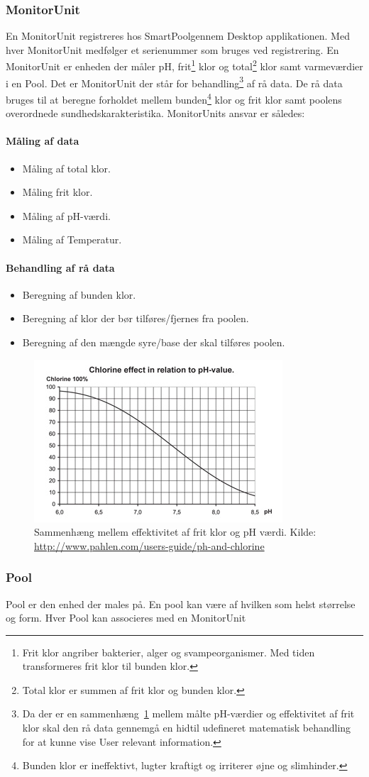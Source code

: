 \subsubsection{MonitorUnit}
En MonitorUnit registreres hos SmartPool\texttrademark gennem Desktop applikationen. Med hver MonitorUnit medfølger et serienummer som bruges ved registrering. En MonitorUnit er enheden der måler pH, frit\footnote{Frit klor angriber bakterier, alger og svampeorganismer. Med tiden transformeres frit klor til bunden klor.} klor og total\footnote{Total klor er summen af frit klor og bunden klor.} klor samt varmeværdier i en Pool. Det er MonitorUnit der står for behandling\footnote{Da der er en sammenhæng~\ref{fig:chlorinePh} mellem målte pH-værdier og effektivitet af frit klor skal den rå data gennemgå en hidtil udefineret matematisk behandling for at kunne vise User relevant information.} af rå data. De rå data bruges til at beregne forholdet mellem bunden\footnote{Bunden klor er ineffektivt, lugter kraftigt og irriterer øjne og slimhinder.} klor og frit klor samt poolens overordnede sundhedskarakteristika. MonitorUnits ansvar er således:

\paragraph{Måling af data}
\begin{itemize}
	\item Måling af total klor.
	\item Måling frit klor.
	\item Måling af pH-værdi.
	\item Måling af Temperatur.
\end{itemize}

\paragraph{Behandling af rå data}
\begin{itemize}
	\item Beregning af bunden klor.
	\item Beregning af klor der bør tilføres/fjernes fra poolen.
	\item Beregning af den mængde syre/base der skal tilføres poolen.
\end{itemize}

\begin{figure}
\centering
\includegraphics[width=0.7\linewidth]{figs/chlorinePh.png}
\caption{Sammenhæng mellem effektivitet af frit klor og pH værdi. Kilde: \url{http://www.pahlen.com/users-guide/ph-and-chlorine}}
\label{fig:chlorinePh}
\end{figure}


\subsubsection{Pool}
Pool er den enhed der males på. En pool kan være af hvilken som helst størrelse og form. Hver Pool kan associeres med en MonitorUnit